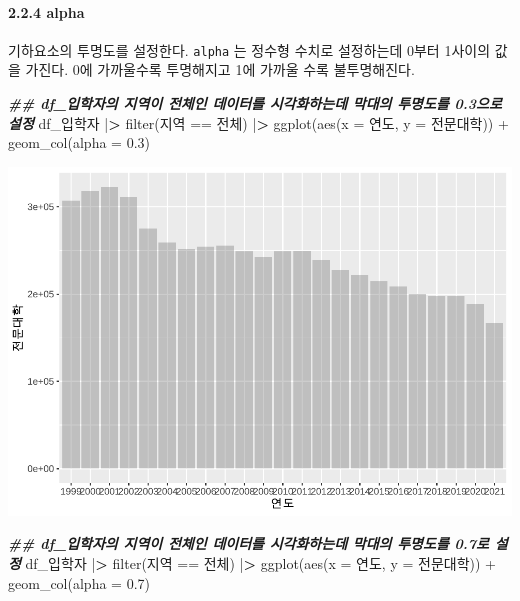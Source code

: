 \documentclass[
]{article}
\newenvironment{Shaded}{\begin{snugshade}}{\end{snugshade}}
\newcommand{\AttributeTok}[1]{\textcolor[rgb]{0.77,0.63,0.00}{#1}}
\newcommand{\DocumentationTok}[1]{\textcolor[rgb]{0.56,0.35,0.01}{\textbf{\textit{#1}}}}
\newcommand{\ErrorTok}[1]{\textcolor[rgb]{0.64,0.00,0.00}{\textbf{#1}}}
\newcommand{\FloatTok}[1]{\textcolor[rgb]{0.00,0.00,0.81}{#1}}
\newcommand{\FunctionTok}[1]{\textcolor[rgb]{0.00,0.00,0.00}{#1}}
\newcommand{\NormalTok}[1]{#1}
\newcommand{\SpecialCharTok}[1]{\textcolor[rgb]{0.00,0.00,0.00}{#1}}
\newcommand{\StringTok}[1]{\textcolor[rgb]{0.31,0.60,0.02}{#1}}
\begin{document}
\hypertarget{alpha}{%
\paragraph{2.2.4 alpha}\label{alpha}}

기하요소의 투명도를 설정한다. \texttt{alpha} 는 정수형 수치로 설정하는데 0부터 1사이의 값을 가진다. 0에 가까울수록 투명해지고 1에 가까울 수록 불투명해진다.

\begin{Shaded}
\begin{Highlighting}[]
\DocumentationTok{\#\# df\_입학자의 지역이 \textquotesingle{}전체\textquotesingle{}인 데이터를 시각화하는데 막대의 투명도를 0.3으로 설정}
\NormalTok{df\_입학자 }\SpecialCharTok{|}\ErrorTok{\textgreater{}} \FunctionTok{filter}\NormalTok{(지역 }\SpecialCharTok{==} \StringTok{\textquotesingle{}전체\textquotesingle{}}\NormalTok{) }\SpecialCharTok{|}\ErrorTok{\textgreater{}}
  \FunctionTok{ggplot}\NormalTok{(}\FunctionTok{aes}\NormalTok{(}\AttributeTok{x =}\NormalTok{ 연도, }\AttributeTok{y =}\NormalTok{ 전문대학)) }\SpecialCharTok{+}
  \FunctionTok{geom\_col}\NormalTok{(}\AttributeTok{alpha =} \FloatTok{0.3}\NormalTok{)}
\end{Highlighting}
\end{Shaded}

\includegraphics{chap3_files/figure-latex/unnamed-chunk-10-1.pdf}

\begin{Shaded}
\begin{Highlighting}[]
\DocumentationTok{\#\# df\_입학자의 지역이 \textquotesingle{}전체\textquotesingle{}인 데이터를 시각화하는데 막대의 투명도를 0.7로 설정}
\NormalTok{df\_입학자 }\SpecialCharTok{|}\ErrorTok{\textgreater{}} \FunctionTok{filter}\NormalTok{(지역 }\SpecialCharTok{==} \StringTok{\textquotesingle{}전체\textquotesingle{}}\NormalTok{) }\SpecialCharTok{|}\ErrorTok{\textgreater{}}
  \FunctionTok{ggplot}\NormalTok{(}\FunctionTok{aes}\NormalTok{(}\AttributeTok{x =}\NormalTok{ 연도, }\AttributeTok{y =}\NormalTok{ 전문대학)) }\SpecialCharTok{+}
  \FunctionTok{geom\_col}\NormalTok{(}\AttributeTok{alpha =} \FloatTok{0.7}\NormalTok{)}
\end{Highlighting}
\end{Shaded}
\end{document}
